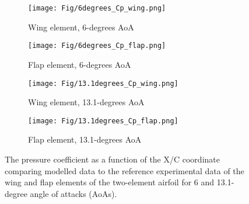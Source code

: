\begin{figure}[H]
  \centering
  \begin{subfigure}[b]{0.6\textwidth}
    \texttt{[image: Fig/6degrees\_Cp\_wing.png]}
    \caption{Wing element, 6-degrees AoA}
    \label{fig:Cp6wing}
  \end{subfigure}
  \hfill
  \begin{subfigure}[b]{0.6\textwidth}
    \texttt{[image: Fig/6degrees\_Cp\_flap.png]}
    \caption{Flap element, 6-degrees AoA}
    \label{fig:Cp6flap}
  \end{subfigure}

  \begin{subfigure}[b]{0.6\textwidth}
    \texttt{[image: Fig/13.1degrees\_Cp\_wing.png]}
    \caption{Wing element, 13.1-degrees AoA}
    \label{fig:Cp13.1wing}
  \end{subfigure}
  \hfill
  \begin{subfigure}[b]{0.6\textwidth}
    \texttt{[image: Fig/13.1degrees\_Cp\_flap.png]}
    \caption{Flap element, 13.1-degrees AoA}
    \label{fig:Cp13.1flap}
  \end{subfigure}

  \caption{The pressure coefficient as a function of the X/C coordinate comparing modelled data to the reference experimental data of the wing and flap elements of the two-element airfoil for 6 and 13.1-degree angle of attacks (AoAs).}
  \label{fig:Cp}
\end{figure}





